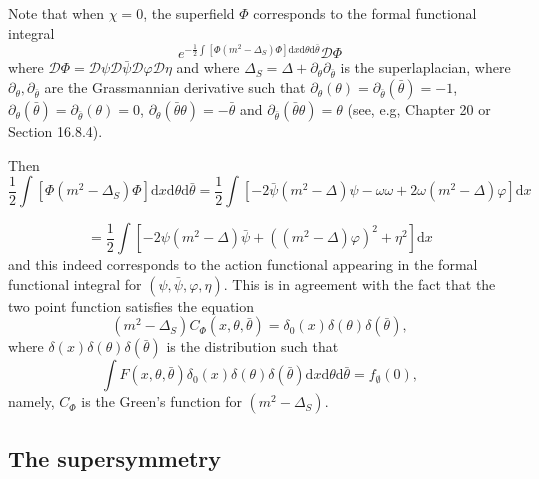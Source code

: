 \documentclass[a4paper,10pt]{article}
\newcommand{\mathd}{\mathrm{d}}
\begin{document}
\begin{remark}
  Note that when $\chi = 0$, the superfield $\Phi$ corresponds to the formal
  functional integral
  \[ e^{- \frac{1}{2} \int [\Phi (m^2 - \Delta_S) \Phi] \mathd x \mathd \theta
     \mathd \bar{\theta}} \mathcal{D} \Phi \]
  where $\mathcal{D} \Phi =\mathcal{D} \psi \mathcal{D} \bar{\psi} \mathcal{D}
  \varphi \mathcal{D} \eta$ and where $\Delta_S = \Delta + \partial_{\theta}
  \partial_{\bar{\theta}}$ is the superlaplacian, where $\partial_{\theta},
  \partial_{\bar{\theta}}$ are the Grassmannian derivative such that
  $\partial_{\theta} (\theta) = \partial_{\bar{\theta}} (\bar{\theta}) = - 1$,
  $\partial_{\theta} (\bar{\theta}) = \partial_{\bar{\theta}} (\theta) = 0$,
  $\partial_{\theta} (\bar{\theta} \theta) = - \bar{\theta}$ and
  $\partial_{\bar{\theta}} (\bar{\theta} \theta) = \theta$ (see, e.g,
  {\cite{Wegner2016}} Chapter 20 or {\cite{Zinn1993}} Section 16.8.4).
  
  Then
  \[ \frac{1}{2} \int [\Phi (m^2 - \Delta_S) \Phi] \mathd x \mathd \theta
     \mathd \bar{\theta} = \frac{1}{2} \int [- 2 \bar{\psi} (m^2 - \Delta)
     \psi - \omega \omega + 2 \omega (m^2 - \Delta) \varphi] \mathd x \]
  
  \[ = \frac{1}{2} \int [- 2 \psi (m^2 - \Delta) \bar{\psi} + ((m^2 - \Delta)
     \varphi)^2 + \eta^2] \mathd x \]
  and this indeed corresponds to the action functional appearing in the formal
  functional integral for $(\psi, \bar{\psi}, \varphi, \eta)$. This is in
  agreement with the fact that the two point function satisfies the equation
  \[ (m^2 - \Delta_S) C_{\Phi} (x, \theta, \bar{\theta}) = \delta_0 (x) \delta
     (\theta) \delta (\bar{\theta}), \]
  where $\delta (x) \delta (\theta) \delta (\bar{\theta})$ is the distribution
  such that
  \[ \int F (x, \theta, \bar{\theta}) \delta_0 (x) \delta (\theta) \delta
     (\bar{\theta}) \mathd x \mathd \theta \mathd \bar{\theta} = f_{\emptyset}
     (0), \]
  namely, $C_{\Phi}$ is the Green's function for $(m^2 - \Delta_S)$.
\end{remark}

\subsection{The supersymmetry}
\end{document}
